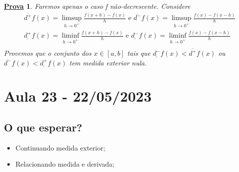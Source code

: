 \documentclass{article}
\newtheorem*{proof*}{\underline{Prova}}
\begin{document}
\begin{proof*}
  Faremos apenas o caso f não-decrescente. Considere 
 \begin{align*}
   &\overline{d^{+}}f(x) = \limsup_{h\to 0^{+}} \frac{f(x+h)-f(x)}{h}\text{ e }\overline{d^{-}}f(x) = \limsup_{h\to 0^{+}}\frac{f(x) - f(x-h)}{h}\\
   &\underline{d^{+}}f(x) = \liminf_{h\to 0^{+}} \frac{f(x+h)-f(x)}{h}\text{ e }\underline{d^{-}}f(x) = \liminf_{h\to 0^{+}}\frac{f(x) - f(x-h)}{h}\\
 \end{align*}
 Provemos que o conjunto dos \(x\in[a, b]\) tais que \(\underline{d^{-}}f(x) < \overline{d^{+}}f(x)\) 
 ou \(\overline{d^{-}}f(x) < \underline{d^{+}}f(x)\) tem medida exterior nula.
\end{proof*}
\newpage

\section{Aula 23 - 22/05/2023}
\subsection{O que esperar?}
\begin{itemize}
  \item Continuando medida exterior;
  \item Relacionando medida e derivada;
\end{itemize}
\end{document}
